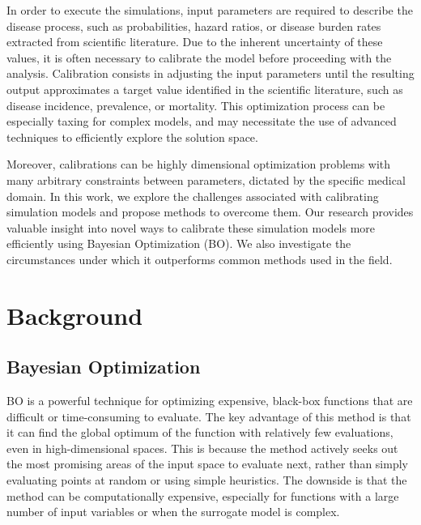 \documentclass{IOS-Book-Article}
\begin{document}
	
	In order to execute the simulations, input parameters are required to describe the disease process, such as probabilities, hazard ratios, or disease burden rates extracted from scientific literature. Due to the inherent uncertainty of these values, it is often necessary to calibrate the model before proceeding with the analysis. Calibration consists in adjusting the input parameters until the resulting output approximates a target value identified in the scientific literature, such as disease incidence, prevalence, or mortality. This optimization process can be especially taxing for complex models, and may necessitate the use of advanced techniques to efficiently explore the solution space.
	
	Moreover, calibrations can be highly dimensional optimization problems with many arbitrary constraints between parameters, dictated by the specific medical domain. In this work, we explore the challenges associated with calibrating simulation models and propose methods to overcome them. Our research provides valuable insight into novel ways to calibrate these simulation models more efficiently using Bayesian Optimization (BO). We also investigate the circumstances under which it outperforms common methods used in the field.	
	
	
	\section{Background}
	
	\subsection{Bayesian Optimization}
	
	BO is a powerful technique for optimizing expensive, black-box functions that are difficult or time-consuming to evaluate\cite{bayesian-opt}. The key advantage of this method is that it can find the global optimum of the function with relatively few evaluations, even in high-dimensional spaces. This is because the method actively seeks out the most promising areas of the input space to evaluate next, rather than simply evaluating points at random or using simple heuristics. The downside is that the method can be computationally expensive, especially for functions with a large number of input variables or when the surrogate model is complex.
	
\end{document}
